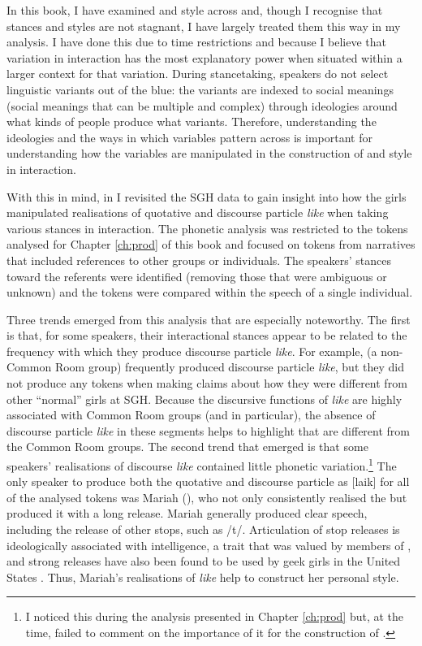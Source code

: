 In this book, I have examined  and style across  and, though I recognise that stances and styles are not stagnant, I have largely treated them this way in my analysis.  I have done this due to time restrictions and because I believe that variation in interaction has the most explanatory power when situated within a larger context for that variation.  During stancetaking, speakers do not select linguistic variants out of the blue: the variants are indexed to social meanings (social meanings that can be multiple and complex) through ideologies around what kinds of people produce what variants.  Therefore, understanding the ideologies and the ways in which variables pattern across  is important for understanding how the variables are manipulated in the construction of  and style in interaction.

With this in mind, in \citet{dragerinpress-DPVC} I revisited the SGH data to gain insight into how the girls manipulated realisations of quotative and discourse particle \textit{like} when taking various stances in interaction.  The phonetic analysis was restricted to the tokens analysed for Chapter \ref{ch:prod} of this book and focused on tokens from narratives that included references to other groups or individuals.  The speakers' stances toward the referents were identified (removing those that were ambiguous or unknown) and the tokens were compared within the speech of a single individual.  
 

Three trends emerged from this analysis that are especially noteworthy.  The first is that, for some speakers, their interactional stances appear to be related to the frequency with which they produce discourse particle \textit{like}.  For example,  (a non-Common Room group) frequently produced discourse particle \textit{like}, but they did not produce any tokens when making claims about how they were different from other ``normal'' girls at SGH.  Because the discursive functions of \textit{like} are highly associated with Common Room groups (and  in particular), the absence of discourse particle \textit{like} in these segments helps to highlight that  are different from the Common Room groups.  The second trend that emerged is that some speakers' realisations of discourse \textit{like} contained little phonetic variation.\footnote{I noticed this during the analysis presented in Chapter \ref{ch:prod} but, at the time, failed to comment on the importance of it for the construction of .}  The only speaker to produce both the quotative and discourse particle as [laik] for all of the analysed tokens was Mariah (), who not only consistently realised the  but produced it with a long release.  Mariah generally produced clear speech, including the release of other stops, such as /t/.  Articulation of stop releases is ideologically associated with intelligence, a trait that was valued by members of , and strong releases have also been found to be used by geek girls in the United States \citep[125]{bucholtz1998}. Thus, Mariah's realisations of \textit{like} help to construct her personal style. 
\largerpage[-1]


